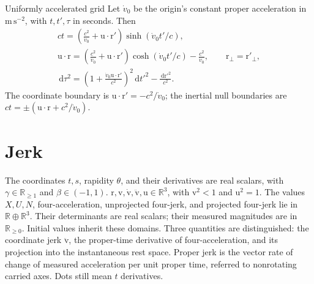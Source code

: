 \documentclass[11pt]{article}
\newcommand{\pv}[1]{{#1}}
\newcommand{\vstyle}[1]{{\bm{\mathrm{#1}}}}
\newcommand{\pN}{\pv{N}}
\newcommand{\pU}{\pv{U}}
\newcommand{\pX}{\pv{X}}
\numberwithin{equation}{section}
\newcommand{\R}{\mathbb{R}}
\newcommand{\dotprod}{\cdot}
\newcommand{\br}{\vstyle{r}}
\newcommand{\bv}{\vstyle{v}}
\newcommand{\bu}{\vstyle{u}}
\newcommand{\dd}{\,\mathrm d}
\begin{document}
\begin{SIunits}{Uniformly accelerated grid}
Let $\dot v_0$ be the origin's constant proper acceleration in
$\mathrm{m\,s^{-2}}$, with $t,t',\tau$ in seconds. Then
\begin{gather*}
 ct=\left(\frac{c^2}{\dot v_0}+\bu\dotprod\br'\right)
 \sinh(\dot v_0t'/c),\\
 \bu\dotprod\br=\left(\frac{c^2}{\dot v_0}+\bu\dotprod\br'\right)
 \cosh(\dot v_0t'/c)-\frac{c^2}{\dot v_0},\qquad
 \br_\perp=\br'_\perp,\\
 \dd\tau^2=\left(1+\frac{\dot v_0\bu\dotprod\br'}{c^2}\right)^2\dd t'^2
 -\frac{\dd\br'^2}{c^2}.
\end{gather*}
The coordinate boundary is $\bu\dotprod\br'=-c^2/\dot v_0$;
the inertial null boundaries are $ct=\pm(\bu\dotprod\br+c^2/\dot v_0)$.
\end{SIunits}
\FloatBarrier

\section{Jerk}
\label{sec:jerk}

The coordinates $t,s$, rapidity $\theta$, and their derivatives are real
scalars, with $\gamma\in\R_{\ge1}$ and $\beta\in(-1,1)$.
$\br,\bv,\dot\bv,\ddot\bv,\bu\in\R^3$, with $\bv^2<1$ and
$\bu^2=1$. The values $\pX,\pU,\pN$, four-acceleration,
unprojected four-jerk, and projected four-jerk lie in $\R\oplus\R^3$.
Their determinants are real scalars; their measured magnitudes are
in $\R_{\ge0}$. Initial values inherit these domains.
Three quantities are distinguished: the coordinate jerk $\ddot{\bv}$,
the proper-time derivative of four-acceleration, and its projection into
the instantaneous rest space. Proper jerk is the vector rate of change
of measured acceleration per unit proper time, referred to nonrotating
carried axes. Dots still mean $t$ derivatives.
\end{document}
